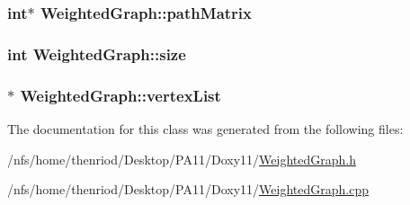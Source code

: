 \hypertarget{class_weighted_graph_ad2e0c787899af85ebf86e9c68431c9aa}{
\subsubsection[{path\-Matrix}]{\setlength{\rightskip}{0pt plus 5cm}int$\ast$ {\bf \-Weighted\-Graph\-::path\-Matrix}}}\label{class_weighted_graph_ad2e0c787899af85ebf86e9c68431c9aa}
\hypertarget{class_weighted_graph_a4452835ad9619580ff968a4d6a9cfe44}{
\subsubsection[{size}]{\setlength{\rightskip}{0pt plus 5cm}int {\bf \-Weighted\-Graph\-::size}}}\label{class_weighted_graph_a4452835ad9619580ff968a4d6a9cfe44}
\hypertarget{class_weighted_graph_a0893fce457ff57820d30fd050777a058}{
\subsubsection[{vertex\-List}]{$\ast$ {\bf \-Weighted\-Graph\-::vertex\-List}}}\label{class_weighted_graph_a0893fce457ff57820d30fd050777a058}


\-The documentation for this class was generated from the following files\-:\begin{DoxyCompactItemize}
\item 
/nfs/home/thenriod/\-Desktop/\-P\-A11/\-Doxy11/\hyperlink{_weighted_graph_8h}{\-Weighted\-Graph.\-h}\item 
/nfs/home/thenriod/\-Desktop/\-P\-A11/\-Doxy11/\hyperlink{_weighted_graph_8cpp}{\-Weighted\-Graph.\-cpp}\end{DoxyCompactItemize}
